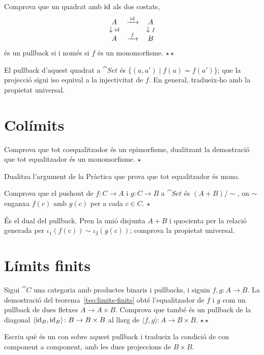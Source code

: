 \begin{exercici}
Comprova que un quadrat amb $\operatorname{id}$ als dos costats,
\[
\begin{array}{ccc}
A & \xrightarrow{\;\operatorname{id}\;} & A\\[-2pt]
\downarrow{\scriptstyle\operatorname{id}} & & \downarrow{\scriptstyle f}\\[-2pt]
A & \xrightarrow{\;f\;} & B
\end{array}
\]
és un pullback si i només si $f$ és un monomorfisme. \hfill{\normalfont$\star\star$}
\begin{indicacio}
El pullback d'aquest quadrat a $\cat{Set}$ és $\{(a,a')\mid f(a)=f(a')\}$; que la projecció sigui iso equival a la injectivitat de $f$. En general, tradueix-ho amb la propietat universal.
\end{indicacio}
\end{exercici}

\section{Colímits}

\begin{exercici}
Comprova que tot coequalitzador és un epimorfisme, dualitzant la demostració que tot equalitzador és un monomorfisme. \hfill{\normalfont$\star$}
\begin{indicacio}
Dualitza l'argument de la Pràctica que prova que tot equalitzador és mono.
\end{indicacio}
\end{exercici}

\begin{exercici}
Comprova que el pushout de $f\colon C\to A$ i $g\colon C\to B$ a $\cat{Set}$ és $(A+B)/{\sim}$, on $\sim$ enganxa $f(c)$ amb $g(c)$ per a cada $c\in C$. \hfill{\normalfont$\star$}
\begin{indicacio}
És el dual del pullback. Pren la unió disjunta $A+B$ i quocienta per la relació generada per $\iota_1(f(c))\sim\iota_2(g(c))$; comprova la propietat universal.
\end{indicacio}
\end{exercici}

\section{Límits finits}

\begin{exercici}
Sigui $\cat{C}$ una categoria amb productes binaris i pullbacks, i siguin $f,g\colon A\to B$. La demostració del teorema~\ref{teo:limits-finits} obté l'equalitzador de $f$ i $g$ com un pullback de dues fletxes $A\to A\times B$. Comprova que també és un pullback de la diagonal $\langle\operatorname{id}_B,\operatorname{id}_B\rangle\colon B\to B\times B$ al llarg de $\langle f,g\rangle\colon A\to B\times B$. \hfill{\normalfont$\star\star$}
\begin{indicacio}
Escriu què és un con sobre aquest pullback i tradueix la condició de con component a component, amb les dues projeccions de $B\times B$.
\end{indicacio}
\end{exercici}

